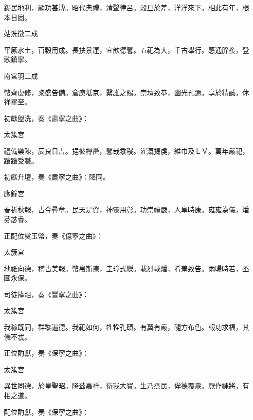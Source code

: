 \begin{pinyinscope}
 錫民地利，厥功甚溥。昭代典禮，清聲律呂。穀旦於差，洋洋來下。相此有年，根本日固。



 姑洗徵二成



 平厥水土，百穀用成。長扶景運，宜歆德馨。五祀為大，千古舉行。感通肸蚃，登歌鎮寧。



 南宮羽二成



 幣齊虔修，粢盛告備。倉庾坻京，繄誰之賜。崇壇致恭，幽光孔邇。享於精誠，休祥畢至。



 初獻盥洗，奏《肅寧之曲》：



 太簇宮



 禮備樂陳，辰良日吉。挹彼樽罍，馨哉黍稷。濯溉揭虔，維巾及ＬＶ。萬年嚴祀，蹌蹌受職。



 初獻升壇，奏《肅寧之曲》：降同。



 應鐘宮



 春祈秋報，古今彞章。民天是資，神靈用彰。功崇禮嚴，人阜時康。雍雍為儀，燔芬苾香。



 正配位奠玉幣，奏《億寧之曲》：



 太簇宮



 地祇向德，稽古美報。幣帛斯陳，圭璋式繅。載烈載燔，肴羞致告。雨暘時若，丕圖永保。



 司徒捧俎，奏《豐寧之曲》：



 太簇宮



 我稼既同，群黎遍德。我祀如何，牲牷孔碩。有翼有嚴，隨方布色。報功求福，其儀不忒。



 正位酌獻，奏《保寧之曲》：



 太簇宮



 異世同德，於皇聖昭。降茲嘉祥，衛我大寶。生乃烝民，侔德覆燾。厥作祼將，有相之道。



 配位酌獻，奏《保寧之曲》：




\end{pinyinscope}
